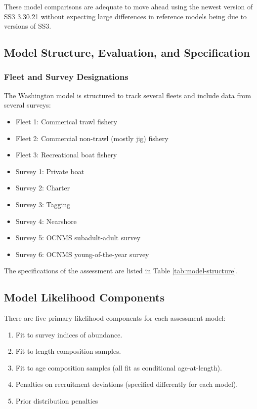 \documentclass[
]{scrartcl}
\providecommand{\tightlist}{%
  \setlength{\itemsep}{0pt}\setlength{\parskip}{0pt}}\usepackage{longtable,booktabs,array}
\begin{document}
These model comparisons are adequate to move ahead using the newest
version of SS3 3.30.21 without expecting large differences in reference
models being due to versions of SS3.

\subsection{Model Structure, Evaluation, and
Specification}\label{model-structure-evaluation-and-specification}

\subsubsection{Fleet and Survey
Designations}\label{fleet-and-survey-designations}

The Washington model is structured to track several fleets and include
data from several surveys:

\begin{itemize}
\tightlist
\item
  Fleet 1: Commerical trawl fishery
\item
  Fleet 2: Commercial non-trawl (mostly jig) fishery
\item
  Fleet 3: Recreational boat fishery
\item
  Survey 1: Private boat\\
\item
  Survey 2: Charter
\item
  Survey 3: Tagging
\item
  Survey 4: Nearshore
\item
  Survey 5: OCNMS subadult-adult survey
\item
  Survey 6: OCNMS young-of-the-year survey
\end{itemize}

The specifications of the assessment are listed in Table
\ref{tab:model-structure}.

\subsection{Model Likelihood
Components}\label{model-likelihood-components}

There are five primary likelihood components for each assessment model:

\begin{enumerate}
\def\labelenumi{\arabic{enumi}.}
\tightlist
\item
  Fit to survey indices of abundance.
\item
  Fit to length composition samples.
\item
  Fit to age composition samples (all fit as conditional age-at-length).
\item
  Penalties on recruitment deviations (specified differently for each
  model).
\item
  Prior distribution penalties
\end{enumerate}
\end{document}
